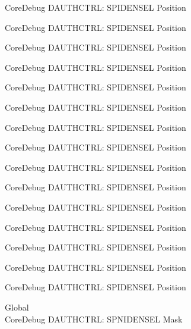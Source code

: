 \begin{DoxyRefList}
\label{deprecated__deprecated000145}%
%
Core\+Debug DAUTHCTRL\+: SPIDENSEL Position 

\label{deprecated__deprecated000221}%
%
Core\+Debug DAUTHCTRL\+: SPIDENSEL Position 

\label{deprecated__deprecated000284}%
%
Core\+Debug DAUTHCTRL\+: SPIDENSEL Position 

\label{deprecated__deprecated000363}%
%
Core\+Debug DAUTHCTRL\+: SPIDENSEL Position 

\label{deprecated__deprecated000439}%
%
Core\+Debug DAUTHCTRL\+: SPIDENSEL Position 

\label{deprecated__deprecated000542}%
%
Core\+Debug DAUTHCTRL\+: SPIDENSEL Position 

\label{deprecated__deprecated000644}%
%
Core\+Debug DAUTHCTRL\+: SPIDENSEL Position 

\label{deprecated__deprecated000769}%
%
Core\+Debug DAUTHCTRL\+: SPIDENSEL Position 

\label{deprecated__deprecated000823}%
%
Core\+Debug DAUTHCTRL\+: SPIDENSEL Position 

\label{deprecated__deprecated000899}%
%
Core\+Debug DAUTHCTRL\+: SPIDENSEL Position 

\label{deprecated__deprecated000962}%
%
Core\+Debug DAUTHCTRL\+: SPIDENSEL Position 

\label{deprecated__deprecated001041}%
%
Core\+Debug DAUTHCTRL\+: SPIDENSEL Position 

\label{deprecated__deprecated001117}%
%
Core\+Debug DAUTHCTRL\+: SPIDENSEL Position 

\label{deprecated__deprecated001220}%
%
Core\+Debug DAUTHCTRL\+: SPIDENSEL Position 

\label{deprecated__deprecated001322}%
%
Core\+Debug DAUTHCTRL\+: SPIDENSEL Position  
\item[Global \doxylink{group___c_m_s_i_s___s_c_b_gaabb5d6c750c9ec50254134ece2111dcd}{Core\+Debug\+\_\+\+DAUTHCTRL\+\_\+\+SPNIDENSEL\+\_\+\+Msk} ]\hfill \\
\label{deprecated__deprecated000088}%
%
Core\+Debug DAUTHCTRL\+: SPNIDENSEL Mask 


\end{DoxyRefList}
